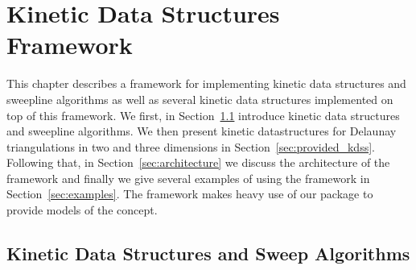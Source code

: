 \chapter{Kinetic Data Structures Framework}
\label{chapter-kds}
\minitoc






\def\note#1{$\langle\langle${\bf #1}$\rangle\rangle$}





This chapter describes a framework for implementing kinetic data
structures and sweepline algorithms as well as several kinetic data
structures implemented on top of this framework. We first, in
Section~\ref{sec:kds_intro} introduce kinetic data structures and
sweepline algorithms. We then present kinetic datastructures for
Delaunay triangulations in two and three dimensions in
Section~\ref{sec:provided_kdss}. Following that, in
Section~\ref{sec:architecture} we discuss the architecture of the
framework and finally we give several examples of using the framework
in Section~\ref{sec:examples}. The framework makes heavy use of our
 package to provide models of the 
concept.

\section{Kinetic Data Structures and Sweep Algorithms}
\label{sec:kds_intro}


